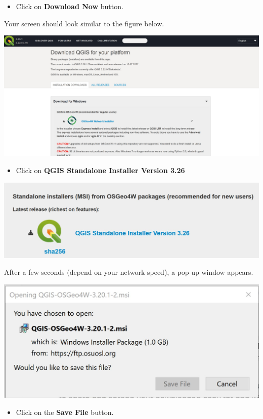 \documentclass[
  letterpaper,
  DIV=11,
  numbers=noendperiod]{scrreprt}
\providecommand{\tightlist}{%
  \setlength{\itemsep}{0pt}\setlength{\parskip}{0pt}}\usepackage{longtable,booktabs,array}
\begin{document}
\begin{itemize}
\tightlist
\item
  Click on \textbf{Download Now} button.
\end{itemize}

Your screen should look similar to the figure below.

\includegraphics{./img/image2.jpg}

\begin{itemize}
\tightlist
\item
  Click on \textbf{QGIS Standalone Installer Version 3.26}
\end{itemize}

\includegraphics{./img/image3.jpg}

After a few seconds (depend on your network speed), a pop-up window
appears.

\includegraphics{./img/image4.jpg}

\begin{itemize}
\tightlist
\item
  Click on the \textbf{Save File} button.
\end{itemize}
\end{document}
